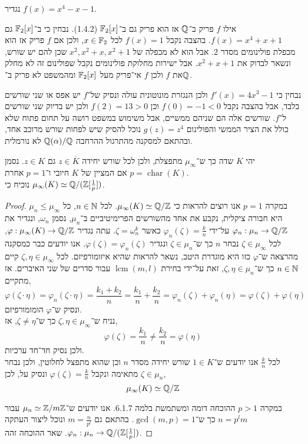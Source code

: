 \subquestion{}
נגדיר $f(x) = x^4 - x - 1$.
\begin{solution}
	אילו $f$ פריק ב־$\mathbb{Q}$ אז הוא פריק גם ב־$\mathbb{F}_2[x]$ (1.4.2).
	נבחין כי ב־$\mathbb{F}_2[x]$ גם $f(x) = x^4 + x + 1$.
	בהצבה נקבל $f(x) = 1$ לכל $x \in \mathbb{F}_2$, ולכן אם $f$ פריק אז הוא מכפלת פולינומים מסדר 2.
	אבל הוא לא מכפלה של $x^2, x^2 + x, x^2 + 1$ שכן להם יש שורש, ונשאר לבדוק את $x^2 + x + 1$.
	אבל ישירות מחלוקת פולינומים נקבל שפולינום זה לא מחלק את $f$ ולכן $f$ אי־פריק מעל $\mathbb{F}_2[x]$ ומהמשפט לא פריק ב־$\mathbb{Q}$.

	נבחין כי $f'(x) = 4x^3 - 1$ ולכן הנגזרת מונוטונית עולה ונסיק של־$f$ יש אפס או שני שורשים בלבד, אבל בהצבה נקבל $f(0) = -1 < 0$ וכן $f(2) = 13 > 0$ ולכן יש בדיוק שני שורשים ל־$f$.
	שורשים אלה הם שניהם ממשיים, אבל משימוש במשפט רושה על תחום פתוח שלא כולל את הציר הממשי והפולינום $g(z) = z^4$ נוכל להסיק שיש לפחות שורש מרוכב אחד, ובהתאם למסקנה מהתרגול ההרחבה $\mathbb{Q}(\alpha) / \mathbb{Q}$ לא נורמלית.
\end{solution}

\question{}
יהי $K$ שדה כך ש־$\mu_\infty$ מתפצלת, ולכן לכל שורש יחידה $z \in \overline{K}$ גם $z \in K$.
נסמן $p = \operatorname{char}(K)$ אם המציין של $K$ חיובי ו־$p = 1$ אחרת. \\
נוכיח כי $\mu_\infty(K) \simeq \mathbb{Q} / (\mathbb{Z}[\frac{1}{p}])$.
\begin{proof}
	במקרה $p = 1$ אנו רוצים להראות כי $\mu_\infty(K) \simeq \mathbb{Q} / \mathbb{Z}$.
	לכל $n \in \mathbb{N}$, כל $\mu_n \le \mu_\infty$ היא חבורה ציקלית, נקבע את אחד מהשורשים הפרימיטיביים ב־$\mu_n$, נסמן $\omega_n$,
	ונגדיר את $\varphi_n : \mu_n \to \mathbb{Q} / \mathbb{Z}$ על־ידי $\varphi_n(\zeta) = \frac{k}{n}$ כאשר $\zeta = \omega_n^k$.
	עתה נגדיר $\varphi : \mu_\infty(K) \to \mathbb{Q} / \mathbb{Z}$, לכל $\zeta \in \mu_\infty$ נבחר $n$ כך ש־$\zeta \in \mu_n$ ונגדיר $\varphi(\zeta) = \varphi_n(\zeta)$.
	אנו יודעים כבר כמסקנה מהרצאה ש־$\varphi$ כזו היא מוגדרת היטב, נשאר להראות שהיא איזומורפיזם.
	לכל $\zeta, \eta \in \mu_\infty$ קיים $n \in \mathbb{N}$ כך ש־$\zeta, \eta \in \mu_n$, זאת על־ידי בחירת $\operatorname{lcm}(m, l)$ עבור סדרים של שני האיברים.
	אז מתקיים,
	\[
		\varphi(\zeta \cdot \eta)
		= \varphi_n(\zeta \cdot \eta)
		= \frac{k_1 + k_2}{n}
		= \frac{k_1}{n} + \frac{k_2}{n}
		= \varphi_n(\zeta) + \varphi_n(\eta)
		= \varphi(\zeta) + \varphi(\eta)
	\]
	ונסיק ש־$\varphi$ הומומורפיזם. \\
	נניח ש־$\zeta, \eta \in \mu_\infty$ כך ש־$\zeta \ne \eta$, אז,
	\[
		\varphi(\zeta)
		= \frac{k_1}{n}
		\ne \frac{k_2}{n}
		= \varphi(\eta)
	\]
	ולכן נסיק חד־חד ערכיות. \\
	לכל $\frac{k}{n}$ אנו יודעים ש־$1 \in K$ שורש יחידה מסדר $n$ וכן שהוא מתפצל לחלוטין, ולכן נבחר $\zeta \in \mu_n$ מתאימה ונקבל $\varphi(\zeta) = \frac{k}{n}$ ונסיק על, לכן,
	\[
		\mu_\infty(K)
		\simeq \mathbb{Q} / \mathbb{Z}
	\]

	במקרה $p > 1$ ההוכחה דומה ומשתמשת בלמה 6.1.7.
	אנו יודעים ש־$\mu_n \simeq \mathbb{Z} / m \mathbb{Z}$ עבור $n = p^l m$ כך ש־$\gcd(m, p) = 1$.
	בהתאם גם $m = \frac{n}{p^l}$ ונוכל ליצור העתקה $\varphi_n : \mu_n \to \mathbb{Q} /(\mathbb{Z}[\frac{1}{p}])$.
	שאר ההוכחה זהה.
\end{proof}


